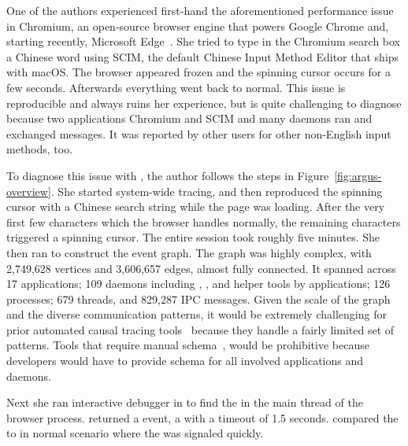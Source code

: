 One of the authors experienced first-hand the aforementioned performance issue
in Chromium, an open-source browser engine that powers Google Chrome and,
starting recently, Microsoft Edge~\cite{chromiumurl}. She tried to type in the
Chromium search box a Chinese word using SCIM, the default Chinese Input Method
Editor that ships with macOS. The browser appeared frozen and the spinning
cursor occurs for a few seconds. Afterwards everything went back to normal.
This issue is reproducible and always ruins her experience, but is quite
challenging to diagnose because two applications Chromium and SCIM and many
daemons ran and exchanged messages. It was reported by other users for
other non-English input methods, too.


To diagnose this issue with \xxx, the author follows the steps in
Figure~\ref{fig:argus-overview}. She started system-wide tracing, and then
reproduced the spinning cursor with a Chinese search string while the page was
loading. After the very first few characters which the browser handles normally,
the remaining characters triggered a spinning cursor. The entire session took roughly
five minutes.
She then ran \xxx to construct the event graph. The graph was highly complex,
with 2,749,628 vertices and 3,606,657 edges, almost fully connected. It spanned
across 17 applications; 109 daemons including , ,
 and helper tools by applications; 126 processes; 679
threads, and 829,287 IPC messages. Given the scale of the graph and the diverse
communication patterns, it would be extremely challenging for prior automated
causal tracing tools~\cite{aguilera2003performance, zhang2013panappticon,
attariyan2012x, cohen2004correlating} because they handle a fairly limited
set of patterns. Tools that require manual schema~\cite{barham2004using,
reynolds2006pip}, would be prohibitive because developers would have to provide
schema for all involved applications and daemons.

Next she ran interactive debugger in \xxx to find the \spinningnode in the main
thread of the browser process. \xxx returned a  event, a 
with a timeout of 1.5 seconds.  
\xxx
compared the \spinningnode to \similarnode in normal scenario where the 
was signaled quickly. 


